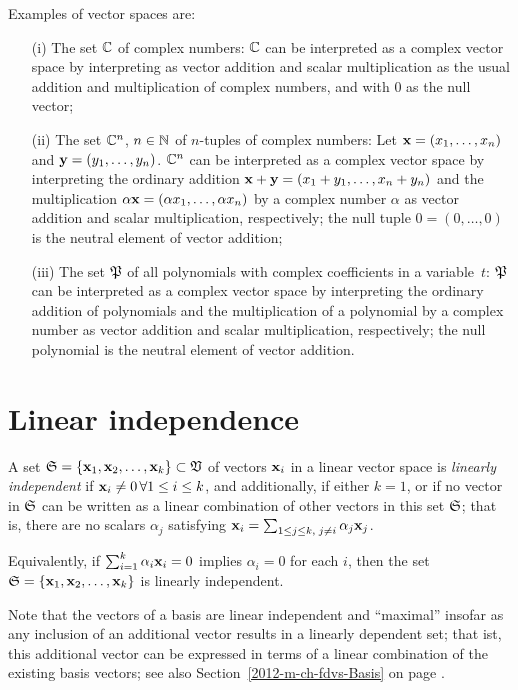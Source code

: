 {
\color{blue}
\bexample
Examples of vector spaces are:
\begin{itemize}
\item[(i)]
The set ${\Bbb C}$ of complex numbers: ${\Bbb C}$  can be interpreted as a complex vector space by  interpreting as vector addition and scalar multiplication
as the usual addition and multiplication of complex numbers, and with $0$ as the null vector;
\item[(ii)]
The set ${\Bbb C}^n$, $n \in {\Bbb N}$ of $n$-tuples of complex numbers:
Let
${\bf x}=
(x_1,\ldots , x_n)$
and
${\bf y}=
(y_1,\ldots , y_n)$.
 ${\Bbb C}^n$  can be interpreted as a complex vector space by  interpreting
the ordinary addition  $ {\bf x} + {\bf y} =  (x_1+y_1,\ldots , x_n+y_n)$
and the multiplication $\alpha {\bf x}=
(\alpha  x_1,\ldots ,\alpha  x_n)$ by a complex number $\alpha$ as vector addition
 and scalar multiplication, respectively;
the null tuple $0 =
(0,\ldots ,0)$ is the neutral element of vector addition;
\item[(iii)]
The set ${\frak P}$
 of all polynomials with complex coefficients in a variable~$t$:
${\frak P}$  can be interpreted as a complex vector space by  interpreting
the ordinary addition of polynomials and the multiplication of a polynomial by a complex number as vector addition and scalar multiplication,
respectively;
the null polynomial is the neutral element of vector addition.
\end{itemize}
\eexample
}


\section{Linear independence}

A set ${\frak S}=\{
{\bf x}_1,
{\bf x}_2,
\ldots ,
{\bf x}_k\} \subset {\frak V}$
of vectors ${\bf x}_i$ in a linear vector space
is {\em linearly independent}
if ${\bf x}_i\neq 0\,\forall 1\le i\le k$,
and additionally, if either $k=1$,
or if no vector in ${\frak S}$ can be written as a linear combination of other vectors in this set ${\frak S}$;
that is, there are no scalars $\alpha_j$ satisfying
 ${\bf x}_i=\sum_{1\le j \le k, \; j\neq i}\alpha_j {\bf x}_j$.

Equivalently, if $\sum_{i=1}^k \alpha_i {\bf x}_i = 0$
 implies $\alpha_i =0$ for each $i$, then the set
${\frak S}=\{
{\bf x}_1,
{\bf x}_2,
\ldots ,
{\bf x}_k\}  $ is linearly independent.


Note that the vectors of a basis are linear independent and ``maximal''
insofar as any inclusion of an additional vector results in a linearly dependent set;
that ist, this additional vector can be expressed in terms of a linear combination of the
existing basis vectors; see also Section~\ref{2012-m-ch-fdvs-Basis} on page \pageref{2012-m-ch-fdvs-Basis}.

